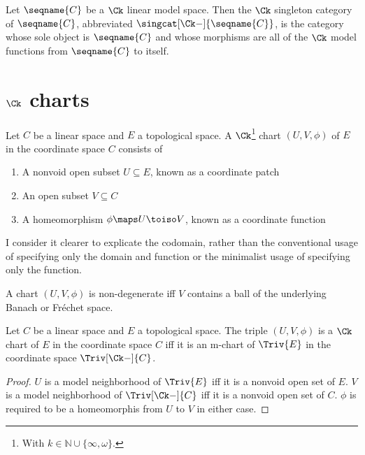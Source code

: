 \documentclass{article}
\begin{document}
\begin{definition}
\label {def:singCk}
Let $\seqname{C}$ be a $\Ck$ linear model space. Then the $\Ck$
singleton category of $\seqname{C}$, abbreviated
$\singcat[\Ck-]{\seqname{C}}$, is the category whose sole object is
$\seqname{C}$ and whose morphisms are all of the $\Ck$ model functions
from $\seqname{C}$ to itself.
\end{definition}

\section{$\Ck$ charts}
{
  \showlabelsinline
  \label{sec:ckcharts}
}
\begin{definition}
\label{def:Ck-chart}
Let $C$ be a linear space and $E$ a topological space. A $\Ck$\footnote{
With $k \in \mathbb{N} \cup \{ \infty, \omega \}$.}
chart $(U, V, \phi)$ of $E$ in the coordinate space $C$ consists of

\begin{enumerate}
\item A nonvoid open subset $U \subseteq E$, known as a coordinate patch
\item An open subset $V \subseteq C$
\item A homeomorphism $\phi \maps U \toiso V$, known as a
coordinate function
\end{enumerate}
\begin{remark}
I consider it clearer to explicate the codomain, rather than the
conventional usage of specifying only the domain and function or the
minimalist usage of specifying only the function.
\end{remark}

A chart $(U, V, \phi)$ is non-degenerate iff $V$ contains a ball of the
underlying Banach or Fr\'echet space.
\end{definition}

\begin{lemma}
\label{lem:Ck-chart}
Let $C$ be a linear space and $E$ a topological space. The triple
$(U, V, \phi)$ is a $\Ck$ chart of $E$ in the coordinate space $C$ iff
it is an m-chart of $\Triv{E}$ in the coordinate space $\Triv[\Ck-]{C}$.

\begin{proof}
$U$ is a model neighborhood of $\Triv{E}$ iff it is a nonvoid open set
of $E$.  $V$ is a model neighborhood of $\Triv[\Ck-]{C}$ iff it is a
nonvoid open set of $C$.  $\phi$ is required to be a homeomorphis from
$U$ to $V$ in either case.
\end{proof}
\end{lemma}
\end{document}
